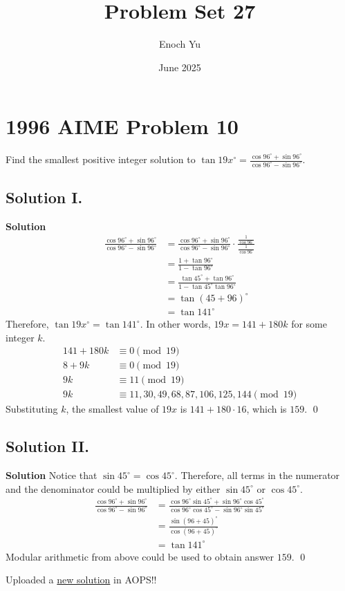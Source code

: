 \documentclass{article}
\title{Problem Set 27}
\author{Enoch Yu}
\date{June 2025}
\newenvironment{solution}{\begin{trivlist}\item[]{\bf Solution}}{\qed \end{trivlist}}
\begin{document}
\section*{1996 AIME Problem 10}
Find the smallest positive integer solution to $\tan19x^\circ = \frac{\cos 96^\circ + \sin 96^\circ}{\cos 96^\circ - \sin 96^\circ}$.
\subsection*{Solution I.}
\begin{solution}
\begin{align*}
    \frac{\cos 96^\circ + \sin 96^\circ}{\cos 96^\circ - \sin 96^\circ}
    &= \frac{\cos 96^\circ + \sin 96^\circ}{\cos 96^\circ - \sin 96^\circ} \cdot \frac{\frac{1}{\cos 96^\circ}}{\frac{1}{\cos 96^\circ}} \\[0.5em]
    &= \frac{1 + \tan 96^\circ}{1 - \tan 96^\circ} \\[0.5em]
    &= \frac{\tan 45^\circ + \tan 96^\circ}{1 - \tan 45^\circ \tan 96^\circ} \\[0.5em]
    &= \tan (45+ 96)^\circ \\[0.5em]
    &= \tan 141^\circ
\end{align*}
Therefore, $\tan19x^\circ = \tan 141^\circ$. In other words, $19x = 141 + 180k$ for some integer $k$.
\begin{align*}
    141 + 180k &\equiv 0 \pmod{19} \\
    8 + 9k &\equiv 0 \pmod{19} \\
    9k &\equiv 11 \pmod{19} \\
    9k &\equiv 11, 30, 49, 68, 87, 106, 125, 144 \pmod{19}
\end{align*}
Substituting $k$, the smallest value of $19x$ is $141 + 180 \cdot 16$, which is $\boxed{159}$.
\end{solution}

\subsection*{Solution II.}
\begin{solution}
Notice that $\sin 45^\circ = \cos 45^\circ$. Therefore, all terms in the numerator and the denominator could be multiplied by either $\sin 45^\circ$ or $\cos 45^\circ$.
\begin{align*}
    \frac{\cos 96^\circ + \sin 96^\circ}{\cos 96^\circ - \sin 96^\circ}
    &= \frac{\cos 96^\circ \sin 45^\circ + \sin 96^\circ \cos 45^\circ}{\cos 96^\circ \cos 45^\circ - \sin 96^\circ \sin 45^\circ} \\[0.5em]
    &= \frac{\sin(96 + 45)^\circ}{\cos(96 + 45)^\circ} \\[0.5em]
    &= \tan 141^\circ
\end{align*}
Modular arithmetic from above could be used to obtain answer $\boxed{159}$.
\end{solution}
Uploaded a \href{https://artofproblemsolving.com/wiki/index.php/1996_AIME_Problems/Problem_10#Solution_5}{new solution} in AOPS!! \\
\end{document}
